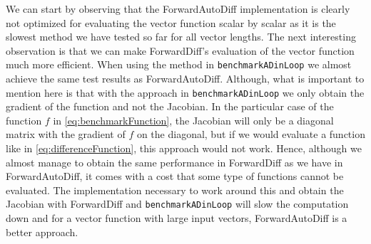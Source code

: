 We can start by observing that the ForwardAutoDiff implementation is clearly not optimized for evaluating the vector function scalar by scalar as it is the slowest method we have tested so far for all vector lengths. The next interesting observation is that we can make ForwardDiff's evaluation of the vector function much more efficient. When using the method in \texttt{benchmarkADinLoop} we almost achieve the same test results as ForwardAutoDiff. Although, what is important to mention here is that with the approach in \texttt{benchmarkADinLoop} we only obtain the gradient of the function and not the Jacobian. In the particular case of the function $f$ in \eqref{eq:benchmarkFunction}, the Jacobian will only be a diagonal matrix with the gradient of $f$ on the diagonal, but if we would evaluate a function like in \eqref{eq:differenceFunction}, this approach would not work. Hence, although we almost manage to obtain the same performance in ForwardDiff as we have in ForwardAutoDiff, it comes with a cost that some type of functions cannot be evaluated. The implementation necessary to work around this and obtain the Jacobian with ForwardDiff and \texttt{benchmarkADinLoop} will slow the computation down and for a vector function with large input vectors, ForwardAutoDiff is a better approach. 

